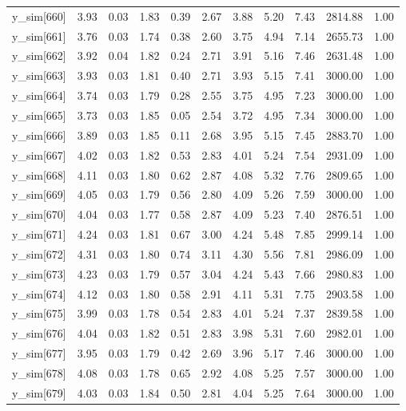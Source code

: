 \begin{table}[ht]
\begin{tabular}{rrrrrrrrrrr}
  y\_sim[660] & 3.93 & 0.03 & 1.83 & 0.39 & 2.67 & 3.88 & 5.20 & 7.43 & 2814.88 & 1.00 \\ 
  y\_sim[661] & 3.76 & 0.03 & 1.74 & 0.38 & 2.60 & 3.75 & 4.94 & 7.14 & 2655.73 & 1.00 \\ 
  y\_sim[662] & 3.92 & 0.04 & 1.82 & 0.24 & 2.71 & 3.91 & 5.16 & 7.46 & 2631.48 & 1.00 \\ 
  y\_sim[663] & 3.93 & 0.03 & 1.81 & 0.40 & 2.71 & 3.93 & 5.15 & 7.41 & 3000.00 & 1.00 \\ 
  y\_sim[664] & 3.74 & 0.03 & 1.79 & 0.28 & 2.55 & 3.75 & 4.95 & 7.23 & 3000.00 & 1.00 \\ 
  y\_sim[665] & 3.73 & 0.03 & 1.85 & 0.05 & 2.54 & 3.72 & 4.95 & 7.34 & 3000.00 & 1.00 \\ 
  y\_sim[666] & 3.89 & 0.03 & 1.85 & 0.11 & 2.68 & 3.95 & 5.15 & 7.45 & 2883.70 & 1.00 \\ 
  y\_sim[667] & 4.02 & 0.03 & 1.82 & 0.53 & 2.83 & 4.01 & 5.24 & 7.54 & 2931.09 & 1.00 \\ 
  y\_sim[668] & 4.11 & 0.03 & 1.80 & 0.62 & 2.87 & 4.08 & 5.32 & 7.76 & 2809.65 & 1.00 \\ 
  y\_sim[669] & 4.05 & 0.03 & 1.79 & 0.56 & 2.80 & 4.09 & 5.26 & 7.59 & 3000.00 & 1.00 \\ 
  y\_sim[670] & 4.04 & 0.03 & 1.77 & 0.58 & 2.87 & 4.09 & 5.23 & 7.40 & 2876.51 & 1.00 \\ 
  y\_sim[671] & 4.24 & 0.03 & 1.81 & 0.67 & 3.00 & 4.24 & 5.48 & 7.85 & 2999.14 & 1.00 \\ 
  y\_sim[672] & 4.31 & 0.03 & 1.80 & 0.74 & 3.11 & 4.30 & 5.56 & 7.81 & 2986.09 & 1.00 \\ 
  y\_sim[673] & 4.23 & 0.03 & 1.79 & 0.57 & 3.04 & 4.24 & 5.43 & 7.66 & 2980.83 & 1.00 \\ 
  y\_sim[674] & 4.12 & 0.03 & 1.80 & 0.58 & 2.91 & 4.11 & 5.31 & 7.75 & 2903.58 & 1.00 \\ 
  y\_sim[675] & 3.99 & 0.03 & 1.78 & 0.54 & 2.83 & 4.01 & 5.24 & 7.37 & 2839.58 & 1.00 \\ 
  y\_sim[676] & 4.04 & 0.03 & 1.82 & 0.51 & 2.83 & 3.98 & 5.31 & 7.60 & 2982.01 & 1.00 \\ 
  y\_sim[677] & 3.95 & 0.03 & 1.79 & 0.42 & 2.69 & 3.96 & 5.17 & 7.46 & 3000.00 & 1.00 \\ 
  y\_sim[678] & 4.08 & 0.03 & 1.78 & 0.65 & 2.92 & 4.08 & 5.25 & 7.57 & 3000.00 & 1.00 \\ 
  y\_sim[679] & 4.03 & 0.03 & 1.84 & 0.50 & 2.81 & 4.04 & 5.25 & 7.64 & 3000.00 & 1.00 \\ 

\end{tabular}
\end{table}
